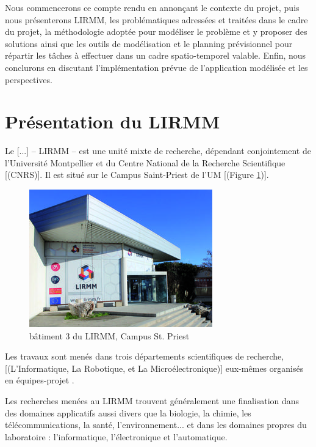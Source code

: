 \documentclass[a4paper,12pt]{book}
\theoremstyle{break}
\theoremstyle{break}
\theoremstyle{definition}
\theoremstyle{remark}
\begin{document}
Nous commencerons ce compte rendu en annonçant le contexte du projet, puis nous présenterons LIRMM, les problématiques adressées et traitées dans le cadre du projet, la méthodologie adoptée pour modéliser le problème et y proposer des solutions ainsi que les outils de modélisation et le planning prévisionnel pour répartir les tâches à effectuer dans un cadre spatio-temporel valable. Enfin, nous conclurons en discutant l'implémentation prévue de l'application modélisée et les perspectives.

\section{Présentation du LIRMM}
\og Le [...] – LIRMM – est une unité mixte de recherche, dépendant conjointement de l'Université Montpellier et du Centre National de la Recherche Scientifique [(CNRS)]. Il est situé sur le Campus Saint-Priest de l'UM [(Figure \ref{fig:lirmmPhoto})].

\begin{figure}[!ht]
  \centering
  \includegraphics[scale=0.9]{images/lirmmPhoto.jpg}
  \caption{bâtiment 3 du LIRMM, Campus St. Priest}
  \label{fig:lirmmPhoto}
\end{figure}

Les travaux sont menés dans trois départements scientifiques de recherche, [(L’Informatique, La Robotique, et La Microélectronique)] eux-mêmes organisés en \og équipes-projet \fg.

Les recherches menées au LIRMM trouvent généralement une finalisation dans des domaines applicatifs aussi divers que la biologie, la chimie, les télécommunications, la santé, l'environnement... et dans les domaines propres du laboratoire : l'informatique, l'électronique et l'automatique.
\end{document}
